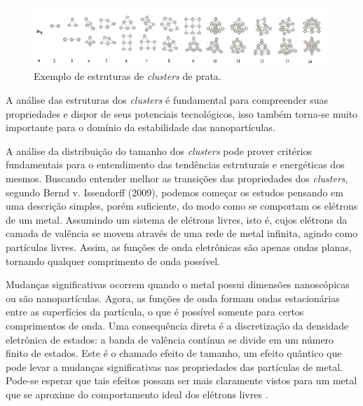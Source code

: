 \begin{figure}
  \centering
  \includegraphics[width=1\textwidth]{images/clusters/estrutura_cluster_ag}
  \caption{ Exemplo de estruturas de \textit{clusters} de prata.\cite{dissertacao_anderson}  }
  \label{fig:estrutura_cluster_ag}
\end{figure}


 A análise das estruturas dos \textit{clusters} é fundamental para compreender suas propriedades e  dispor de seus potenciais tecnológicos, isso também torna-se muito importante para o domínio da estabilidade das nanopartículas. 


A análise da distribuição do tamanho dos \textit{clusters} pode prover critérios fundamentais para o entendimento das tendências estruturais e energéticas dos mesmos. Buscando entender melhor as transições das propriedades dos \textit{clusters}, segundo Bernd v. Issendorff (2009), podemos começar os estudos pensando em uma descrição simples, porém suficiente, do modo como se comportam os elétrons de um metal. Assumindo um sistema de elétrons livres, isto é, cujos elétrons da camada de valência se movem através de uma rede de metal infinita, agindo como partículas livres. Assim, as funções de onda eletrônicas são apenas ondas planas, tornando qualquer comprimento de onda possível.

Mudanças significativas ocorrem quando o metal possui dimensões nanoscópicas ou são nanopartículas. Agora, as funções de onda formam ondas estacionárias entre as superfícies da partícula, o que é possível somente para certos comprimentos de onda. Uma consequência direta é a discretização da densidade eletrônica de estados: a banda de valência contínua se divide em um número finito de estados. Este é o chamado efeito de tamanho, um efeito quântico que pode levar a mudanças significativas nas propriedades das partículas de metal. Pode-se esperar que tais efeitos possam ser mais claramente vistos para um metal que se aproxime do comportamento ideal dos elétrons livres \cite{capitulo_livro_shell}.

